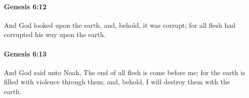 		\paragraph{Genesis 6:12} %
			\label{GENESIS-6-12}

			And God looked upon the earth, and, behold, it was corrupt; for all flesh had corrupted his way upon the earth.


		\paragraph{Genesis 6:13} %
			\label{GENESIS-6-13}

			And God said unto Noah, The end of all flesh is come before me; for the earth is filled with violence through them; and, behold, I will destroy them with the earth.


